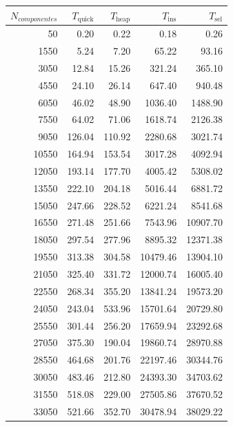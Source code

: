\documentclass{homework}
\begin{document}
    \begin{table}[H]
        \footnotesize
        \centering
        \begin{tabular}{|r|r|r|r|r|}
            \hline
            $N_{componentes}$ & $T_{\text{quick}}$ & $T_{\text{heap}}$ & $T_{\text{ins}}$ & $T_{\text{sel}}$ \\
            \hline
            50 & 0.20 & 0.22 & 0.18 & 0.26 \\ 
            1550 & 5.24 & 7.20 & 65.22 & 93.16 \\ 
            3050 & 12.84 & 15.26 & 321.24 & 365.10 \\ 
            4550 & 24.10 & 26.14 & 647.40 & 940.48 \\ 
            6050 & 46.02 & 48.90 & 1036.40 & 1488.90 \\ 
            7550 & 64.02 & 71.06 & 1618.74 & 2126.38 \\ 
            9050 & 126.04 & 110.92 & 2280.68 & 3021.74 \\ 
            10550 & 164.94 & 153.54 & 3017.28 & 4092.94 \\ 
            12050 & 193.14 & 177.70 & 4005.42 & 5308.02 \\ 
            13550 & 222.10 & 204.18 & 5016.44 & 6881.72 \\ 
            15050 & 247.66 & 228.52 & 6221.24 & 8541.68 \\ 
            16550 & 271.48 & 251.66 & 7543.96 & 10907.70 \\ 
            18050 & 297.54 & 277.96 & 8895.32 & 12371.38 \\ 
            19550 & 313.38 & 304.58 & 10479.46 & 13904.10 \\ 
            21050 & 325.40 & 331.72 & 12000.74 & 16005.40 \\ 
            22550 & 268.34 & 355.20 & 13841.24 & 19573.20 \\ 
            24050 & 243.04 & 533.96 & 15701.64 & 20729.80 \\ 
            25550 & 301.44 & 256.20 & 17659.94 & 23292.68 \\ 
            27050 & 375.30 & 190.04 & 19860.74 & 28970.88 \\ 
            28550 & 464.68 & 201.76 & 22197.46 & 30344.76 \\ 
            30050 & 483.46 & 212.80 & 24393.30 & 34703.62 \\ 
            31550 & 518.08 & 229.00 & 27505.86 & 37670.52 \\ 
            33050 & 521.66 & 352.70 & 30478.94 & 38029.22 \\ 

\end{tabular}
\end{table}
\end{document}
